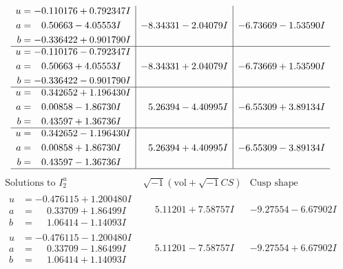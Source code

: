 \documentclass[1p]{elsarticle_modified}
\theoremstyle{definition}
\newcommand{\I}{\sqrt{-1}}
\begin{document}
$$\begin{array}{c|c|c}
\begin{aligned}
u &= -0.110176 + 0.792347 I \\
a &= \phantom{-}0.50663 - 4.05553 I \\
b &= -0.336422 + 0.901790 I\end{aligned}
 & -8.34331 - 2.04079 I & -6.73669 - 1.53590 I \\ \hline\begin{aligned}
u &= -0.110176 - 0.792347 I \\
a &= \phantom{-}0.50663 + 4.05553 I \\
b &= -0.336422 - 0.901790 I\end{aligned}
 & -8.34331 + 2.04079 I & -6.73669 + 1.53590 I \\ \hline\begin{aligned}
u &= \phantom{-}0.342652 + 1.196430 I \\
a &= \phantom{-}0.00858 - 1.86730 I \\
b &= \phantom{-}0.43597 + 1.36736 I\end{aligned}
 & \phantom{-}5.26394 - 4.40995 I & -6.55309 + 3.89134 I \\ \hline\begin{aligned}
u &= \phantom{-}0.342652 - 1.196430 I \\
a &= \phantom{-}0.00858 + 1.86730 I \\
b &= \phantom{-}0.43597 - 1.36736 I\end{aligned}
 & \phantom{-}5.26394 + 4.40995 I & -6.55309 - 3.89134 I\\
 \hline 
 \end{array}$$\newpage$$\begin{array}{c|c|c}  
\text{Solutions to }I^u_{2}& \I (\text{vol} + \sqrt{-1}CS) & \text{Cusp shape}\\
 \hline 
\begin{aligned}
u &= -0.476115 + 1.200480 I \\
a &= \phantom{-}0.33709 + 1.86499 I \\
b &= \phantom{-}1.06414 - 1.14093 I\end{aligned}
 & \phantom{-}5.11201 + 7.58757 I & -9.27554 - 6.67902 I \\ \hline\begin{aligned}
u &= -0.476115 - 1.200480 I \\
a &= \phantom{-}0.33709 - 1.86499 I \\
b &= \phantom{-}1.06414 + 1.14093 I\end{aligned}
 & \phantom{-}5.11201 - 7.58757 I & -9.27554 + 6.67902 I \\ \hline\begin{aligned}

\end{aligned}
\end{array}$$
\end{document}
